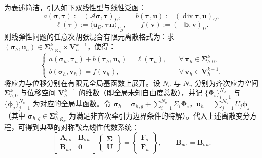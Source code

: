 为表述简洁，引入如下双线性型与线性泛函：
\[
a(\boldsymbol{\sigma},\boldsymbol{\tau}):=(\mathcal{A}\boldsymbol{\sigma},\boldsymbol{\tau})_{\Omega},\qquad b(\boldsymbol{\tau},\boldsymbol{u}):=(\operatorname{div}\boldsymbol{\tau},\boldsymbol{u})_{\Omega},
\]
\[
\ell(\boldsymbol{\tau}):=\langle \boldsymbol{u}_D,\boldsymbol{\tau}\boldsymbol{n}\rangle_{\Gamma_D},\qquad f(\boldsymbol{v}):=(-\boldsymbol{b},\boldsymbol{v})_{\Omega}.
\]
则线弹性问题的任意次胡张混合有限元离散格式为：求 $(\boldsymbol{\sigma}_h,\boldsymbol{u}_h)\in \boldsymbol{\Sigma}_{h,\boldsymbol{g}_N}^k\times \boldsymbol{V}_h^{k-1}$，使得：
\begin{equation} \label{eq:ch5_hz_discrete_weak_form}
	\begin{cases}
		a(\boldsymbol{\sigma}_h,\boldsymbol{\tau}_h)+b(\boldsymbol{\tau}_h,\boldsymbol{u}_h)=\ell(\boldsymbol{\tau}_h), &\quad \forall\,\boldsymbol{\tau}_h\in\boldsymbol{\Sigma}_{h,0}^k,\\[0.4em] 
		b(\boldsymbol{\sigma}_h,\boldsymbol{v}_h) = f(\boldsymbol{v}_h), &\quad \forall\,\boldsymbol{v}_h\in \boldsymbol{V}_h^{k-1}. 
	\end{cases}
\end{equation}
将应力与位移分别在有限元全局基函数上展开。设 $N_\sigma$ 与 $N_u$ 分别为齐次应力空间 $\boldsymbol{\Sigma}_{h,0}^k$ 与位移空间 $\boldsymbol{V}_h^{k-1}$ 的维数（即全局未知自由度总数），并记 $\{\boldsymbol{\Phi}_i\}_{i=1}^{N_\sigma}$ 与 $\{\boldsymbol{\phi}_j\}_{j=1}^{N_u}$ 为对应的全局基函数。令 $\boldsymbol{\sigma}_h = \boldsymbol{\sigma}_{h,g} + \sum_{i=1}^{N_\sigma}\Sigma_i\boldsymbol{\Phi}_i$，$\boldsymbol{u}_h=\sum_{j=1}^{N_u}U_j\boldsymbol{\phi}_j$（其中 $\boldsymbol{\sigma}_{h,g} \in \boldsymbol{\Sigma}_{h,\boldsymbol{g}_N}^k$ 为满足非齐次牵引力边界条件的特解）。代入上述离散变分方程，可得到典型的对称鞍点线性代数系统：
\begin{equation} \label{eq:ch5_saddle_point_system}
	\begin{bmatrix} 
		\boldsymbol{A}_{\sigma\sigma} & \boldsymbol{B}_{\sigma u}\\ \boldsymbol{B}_{u\sigma} & \boldsymbol{0} 
	\end{bmatrix} 
	\begin{Bmatrix} 
		\boldsymbol{\Sigma}\\ \boldsymbol{U} 
	\end{Bmatrix} = 
	\begin{Bmatrix} 
		\boldsymbol{F}_{\sigma}\\ \boldsymbol{F}_{u} 
	\end{Bmatrix}, 
	\qquad \boldsymbol{B}_{u\sigma}=\boldsymbol{B}_{\sigma u}^{\top}.
\end{equation}
